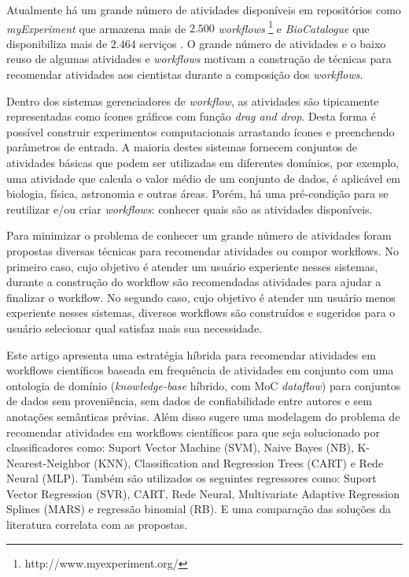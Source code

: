 \documentclass[10pt,letterpaper]{article}
\begin{document}
Atualmente h{\'a} um grande n{\'u}mero de atividades dispon{\'i}veis em reposit{\'o}rios como \emph{myExperiment} que armazena mais de \(2.500\) \emph{workflows} \footnote{http://www.myexperiment.org/} e \emph{BioCatalogue} que disponibiliza mais de \(2.464\) servi\c{c}os \cite{Biocatalogue}. O grande n{\'u}mero de atividades e o baixo reuso de algumas atividades e \emph{workflows} \cite{Wang2010} motivam a constru\c{c}{\~a}o de t{\'e}cnicas para recomendar atividades aos cientistas durante a composi\c{c}{\~a}o dos \emph{workflows}.

Dentro dos sistemas gerenciadores de \textit{workflow}, as atividades s{\~a}o tipicamente representadas como {\'i}cones gr{\'a}ficos com fun\c{c}{\~a}o \textit{drag and drop}. Desta forma {\'e} poss{\'i}vel construir experimentos computacionais arrastando {\'i}cones e preenchendo par{\^a}metros de entrada. A maioria destes sistemas fornecem conjuntos de atividades b{\'a}sicas que podem ser utilizadas em diferentes dom{\'i}nios, por exemplo, uma atividade que calcula o valor m{\'e}dio de um conjunto de dados, {\'e} aplic{\'a}vel em biologia, f{\'i}sica, astronomia e outras {\'a}reas. Por{\'e}m, h{\'a} uma pr{\'e}-condi\c{c}{\~a}o para se reutilizar e/ou criar \textit{workflows}: conhecer quais s{\~a}o as atividades dispon{\'i}veis.

Para minimizar o problema de conhecer um grande número de atividades foram propostas diversas técnicas para recomendar atividades ou compor workflows. No primeiro caso, cujo objetivo é atender um usuário experiente nesses sistemas, durante a construção do workflow são recomendadas atividades para ajudar a finalizar o workflow. No segundo caso, cujo objetivo é atender um usuário menos experiente nesses sistemas, diversos workflows são construídos e sugeridos para o usuário selecionar qual satisfaz mais sua necessidade.

Este artigo apresenta uma estrat{\'e}gia h{\'i}brida para recomendar atividades em workflows cient{\'i}ficos baseada em frequ{\^e}ncia de atividades em conjunto com uma ontologia de dom{\'i}nio (\emph{knowledge-base} h{\'i}brido, com MoC \emph{dataflow}) para conjuntos de dados sem proveni{\^e}ncia, sem dados de confiabilidade entre autores e sem anota\c{c}{\~o}es sem{\^a}nticas pr{\'e}vias. Al{\'e}m disso  sugere uma modelagem do problema de recomendar atividades em workflows cient{\'i}ficos para que seja solucionado por classificadores como: Suport Vector Machine (SVM), Naive Bayes (NB), K-Nearest-Neighbor (KNN), Classification and Regression Trees (CART) e Rede Neural (MLP). Tamb{\'e}m s{\~a}o utilizados os seguintes regressores como: Suport Vector Regression (SVR), CART, Rede Neural, Multivariate Adaptive Regression Splines (MARS) e regress{\~a}o binomial (RB). E uma compara\c{c}{\~a}o das solu\c{c}{\~o}es da literatura correlata com as propostas.
\end{document}
